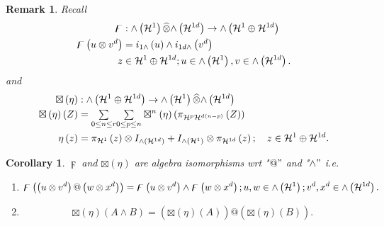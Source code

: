 \documentclass[aps,preprint]{revtex4}%
\newtheorem{corollary}[theorem]{Corollary}
\newtheorem{remark}[theorem]{Remark}
\begin{document}
\begin{remark}
Recall
\begin{align}
\digamma &  :{\huge \wedge}\left(  \mathcal{H}^{1}\right)  \widehat{\otimes
}{\huge \wedge}\left(  \mathcal{H}^{1d}\right)  \rightarrow{\huge \wedge
}\left(  \mathcal{H}^{1}\oplus\mathcal{H}^{1d}\right)  \\
\digamma\left(  u\otimes v^{d}\right)   &  =i_{1\wedge}\left(  u\right)
\wedge i_{1d\wedge}\left(  v^{d}\right)  \\
\quad z &  \in\mathcal{H}^{1}\oplus\mathcal{H}^{1d};u\in{\huge \wedge}\left(
\mathcal{H}^{1}\right)  ,v\in{\huge \wedge}\left(  \mathcal{H}^{1d}\right)  .
\end{align}
and
\begin{align}
\boxtimes\left(  \eta\right)   &  :{\huge \wedge}\left(  \mathcal{H}^{1}%
\oplus\mathcal{H}^{1d}\right)  \rightarrow{\huge \wedge}\left(  \mathcal{H}%
^{1}\right)  \widehat{\otimes}{\huge \wedge}\left(  \mathcal{H}^{1d}\right)
\\
\boxtimes\left(  \eta\right)  \left(  Z\right)   &  =%
{\textstyle\sum\limits_{0\leq n\leq r}}
{\textstyle\sum\limits_{0\leq p\leq n}}
\boxtimes^{n}\left(  \eta\right)  \left(  \pi_{\mathcal{H}^{p}\mathcal{H}%
^{d\left(  n-p\right)  }}\left(  Z\right)  \right)  \ \\
\eta\left(  z\right)   &  =\pi_{\mathcal{H}^{1}}\left(  z\right)  \otimes
I_{{\huge \wedge}\left(  \mathcal{H}^{1d}\right)  }+I_{{\huge \wedge}\left(
\mathcal{H}^{1}\right)  }\otimes\pi_{\mathcal{H}^{1d}}\left(  z\right)  ;\quad
z\in\mathcal{H}^{1}\oplus\mathcal{H}^{1d}.
\end{align}

\end{remark}

\begin{corollary}
$\digamma$ and $\boxtimes\left(  \eta\right)  $ are algebra isomorphisms wrt
"$@"$ and "$\wedge"$ i.e.

\begin{enumerate}
\item
\begin{equation}
\digamma\left(  \left(  u\otimes v^{d}\right)  @\left(  w\otimes x^{d}\right)
\right)  =\digamma\left(  u\otimes v^{d}\right)  \wedge\digamma\left(
w\otimes x^{d}\right)  ;u,w\in{\huge \wedge}\left(  \mathcal{H}^{1}\right)
;v^{d},x^{d}\in{\huge \wedge}\left(  \mathcal{H}^{1d}\right)  .
\end{equation}


\item
\begin{equation}
\boxtimes\left(  \eta\right)  \left(  A\wedge B\right)  =\left(
\overset{}{\boxtimes\left(  \eta\right)  \left(  A\right)  }\right)  @\left(
\overset{}{\boxtimes\left(  \eta\right)  \left(  B\right)  }\right)  .
\end{equation}

\end{enumerate}
\end{corollary}
\end{document}
